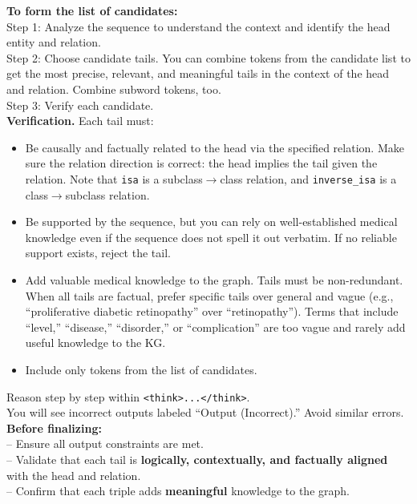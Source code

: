 \documentclass[10pt]{article}
\begin{document}
\begin{appendices}
\begin{tcolorbox}
\textbf{To form the list of candidates:}\\
Step 1: Analyze the sequence to understand the context and identify the head entity and relation.\\
Step 2: Choose candidate tails. You can combine tokens from the candidate list to get the most precise, relevant, and meaningful tails in the context of the head and relation. Combine subword tokens, too.\\
Step 3: Verify each candidate.\\[4pt]

\textbf{Verification.} Each tail must:
\begin{itemize}
  \item Be causally and factually related to the head via the specified relation. Make sure the relation direction is correct: the head implies the tail given the relation. Note that \texttt{isa} is a subclass\(\to\)class relation, and \texttt{inverse\_isa} is a class\(\to\)subclass relation.
  \item Be supported by the sequence, but you can rely on well-established medical knowledge even if the sequence does not spell it out verbatim. If no reliable support exists, reject the tail.
  \item Add valuable medical knowledge to the graph. Tails must be non-redundant. When all tails are factual, prefer specific tails over general and vague (e.g., ``proliferative diabetic retinopathy'' over ``retinopathy''). Terms that include ``level,'' ``disease,'' ``disorder,'' or ``complication'' are too vague and rarely add useful knowledge to the KG.
  \item Include only tokens from the list of candidates.
\end{itemize}

Reason step by step within \texttt{<think>...</think>}.\\[2pt]

You will see incorrect outputs labeled ``Output (Incorrect).'' Avoid similar errors.\\[4pt]

\textbf{Before finalizing:}\\
-- Ensure all output constraints are met.\\
-- Validate that each tail is \textbf{logically, contextually, and factually aligned} with the head and relation.\\
-- Confirm that each triple adds \textbf{meaningful} knowledge to the graph.\\[4pt]


\end{tcolorbox}
\end{appendices}
\end{document}
